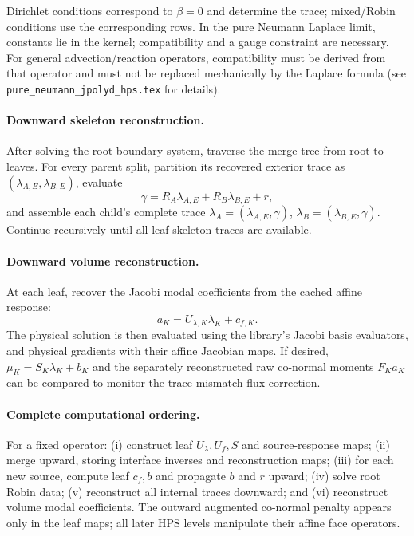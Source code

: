 \documentclass[11pt]{article}
\begin{document}
Dirichlet conditions correspond to $\beta=0$ and determine the trace;
mixed/Robin conditions use the corresponding rows.  In the pure
Neumann Laplace limit, constants lie in the kernel; compatibility and
a gauge constraint are necessary.  For general advection/reaction
operators, compatibility must be derived from that operator and must
not be replaced mechanically by the Laplace formula (see
\texttt{pure\_neumann\_jpolyd\_hps.tex} for details).

\paragraph{Downward skeleton reconstruction.}
After solving the root boundary system, traverse the merge tree from
root to leaves.  For every parent split, partition its recovered
exterior trace as $(\lambda_{A,E},\lambda_{B,E})$, evaluate
\begin{equation}\label{eq:full_downward_gamma}
 \gamma=R_A\lambda_{A,E}+R_B\lambda_{B,E}+r,
\end{equation}
and assemble each child's complete trace
$\lambda_A=(\lambda_{A,E},\gamma)$,
$\lambda_B=(\lambda_{B,E},\gamma)$.
Continue recursively until all leaf skeleton traces are available.

\paragraph{Downward volume reconstruction.}
At each leaf, recover the Jacobi modal coefficients from the cached
affine response:
\begin{equation}\label{eq:full_reconstruction}
 \boxed{a_K=U_{\lambda,K}\lambda_K+c_{f,K}.}
\end{equation}
The physical solution is then evaluated using the library's Jacobi
basis evaluators, and physical gradients with their affine Jacobian
maps.  If desired, $\mu_K=S_K\lambda_K+b_K$ and the separately
reconstructed raw co-normal moments $F_Ka_K$ can be compared to
monitor the trace-mismatch flux correction.

\paragraph{Complete computational ordering.}
For a fixed operator: (i) construct leaf $U_{\lambda},U_f,S$ and
source-response maps; (ii) merge upward, storing interface inverses
and reconstruction maps; (iii) for each new source, compute leaf
$c_f,b$ and propagate $b$ and $r$ upward; (iv) solve root Robin data;
(v) reconstruct all internal traces downward; and (vi) reconstruct
volume modal coefficients.  The outward augmented co-normal penalty
appears only in the leaf maps; all later HPS levels manipulate their
affine face operators.
\end{document}
